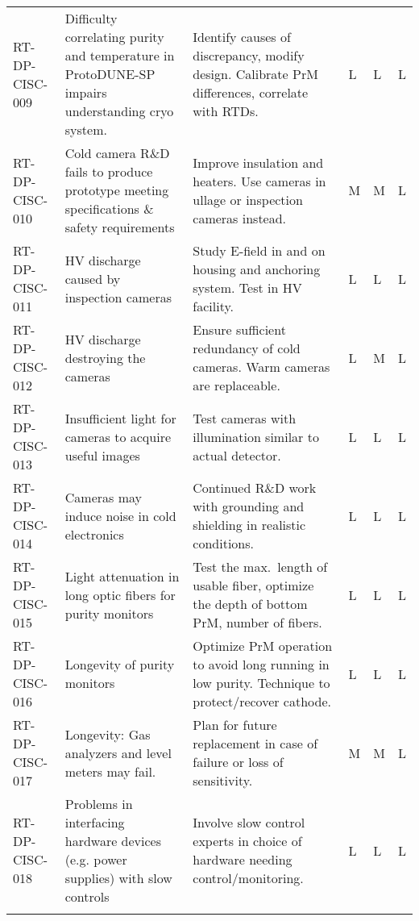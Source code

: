\begin{footnotesize}
\begin{longtable}{p{}p{}p{}p{}p{}p{}}
RT-DP-CISC-009 & Difficulty correlating purity and temperature in ProtoDUNE-SP impairs understanding cryo system. & Identify causes of discrepancy, modify design. Calibrate PrM differences, correlate with RTDs. & L & L & L \\  \colhline
RT-DP-CISC-010 & Cold camera R\&D fails to produce prototype meeting specifications \& safety requirements & Improve insulation and heaters. Use cameras in ullage or inspection cameras instead. & M & M & L \\  \colhline
RT-DP-CISC-011 & HV discharge caused by inspection cameras & Study E-field in and on housing and anchoring system. Test in HV facility. & L & L & L \\  \colhline
RT-DP-CISC-012 & HV discharge destroying the cameras & Ensure sufficient redundancy of cold cameras. Warm cameras are replaceable. & L & M & L \\  \colhline
RT-DP-CISC-013 & Insufficient light for cameras to acquire useful images & Test cameras with illumination similar to actual detector. & L & L & L \\  \colhline
RT-DP-CISC-014 & Cameras may induce noise in cold electronics & Continued R\&D work with grounding and shielding in realistic conditions. & L & L & L \\  \colhline
RT-DP-CISC-015 & Light attenuation in long optic fibers for purity monitors  & Test the max.\ length of usable fiber, optimize the depth of bottom PrM, number of fibers. & L & L & L \\  \colhline
RT-DP-CISC-016 & Longevity of purity monitors & Optimize PrM operation to avoid long running in low purity. Technique to protect/recover cathode. & L & L & L \\  \colhline
RT-DP-CISC-017 & Longevity: Gas analyzers and level meters may fail. & Plan for future replacement in case of failure or loss of sensitivity.  & M & M & L \\  \colhline
RT-DP-CISC-018 & Problems in interfacing  hardware devices (e.g. power supplies) with slow controls & Involve slow control experts in choice of hardware needing control/monitoring.
 & L & L & L \\  \colhline

\label{tab:risks:DP-FD-CISC}
\end{longtable}
\end{footnotesize}